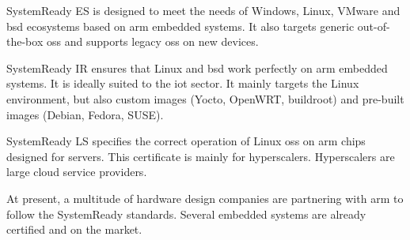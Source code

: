 SystemReady ES is designed to meet the needs of Windows, Linux, VMware and \acrshort{bsd} ecosystems based on \gls{arm} embedded systems. It also targets generic out-of-the-box \acrshort{os}s and supports legacy \acrshort{os}s on new devices. \cite{systemready_program}

SystemReady IR ensures that Linux and \acrshort{bsd} work perfectly on \gls{arm} embedded systems. It is ideally suited to the \acrshort{iot} sector. It mainly targets the Linux environment, but also custom images (Yocto, OpenWRT, buildroot) and pre-built images (Debian, Fedora, SUSE). \cite{systemready_program}

SystemReady LS specifies the correct operation of Linux \acrshort{os}s on \gls{arm} chips designed for servers. This certificate is mainly for hyperscalers. Hyperscalers are large \gls{cloud} service providers. \cite{systemready_program}

At present, a multitude of hardware design companies are partnering with \gls{arm} to follow the SystemReady standards. Several embedded systems are already certified and on the market.